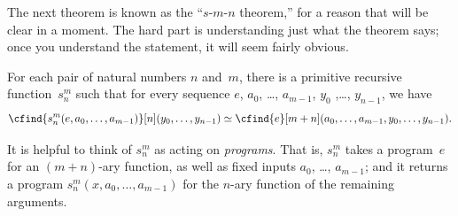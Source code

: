 \documentclass[../../../include/open-logic-section]{subfiles}
\begin{document}

\begin{explain}
The next theorem is known as the ``$s$-$m$-$n$ theorem,'' for a reason
that will be clear in a moment. The hard part is understanding just
what the theorem says; once you understand the statement, it will seem
fairly obvious.
\end{explain}

\begin{thm}
  For each pair of natural numbers $n$ and~$m$, there is a primitive
  recursive function~$s^m_n$ such that for every sequence
  $e$, $a_0$, \dots, $a_{m-1}$, $y_0$ ,\dots, $y_{n-1}$, we have
  \[
  \cfind{s^m_n(e, a_0, \dots, a_{m-1})}[n](y_0, \dots, y_{n-1}) \simeq
  \cfind{e}[m+n](a_0, \dots, a_{m-1}, y_0, \dots, y_{n-1}).
\]
\end{thm}

\begin{explain}
It is helpful to think of $s^m_n$ as acting on \emph{programs}. That
is, $s^m_n$ takes a program~$e$ for an $(m+n)$-ary function, as well
as fixed inputs $a_0$, \dots, $a_{m-1}$; and it returns a program
$s^m_n(x, a_0, \dots, a_{m-1})$ for the $n$-ary function of the
remaining arguments. 
\end{explain}
\end{document}
